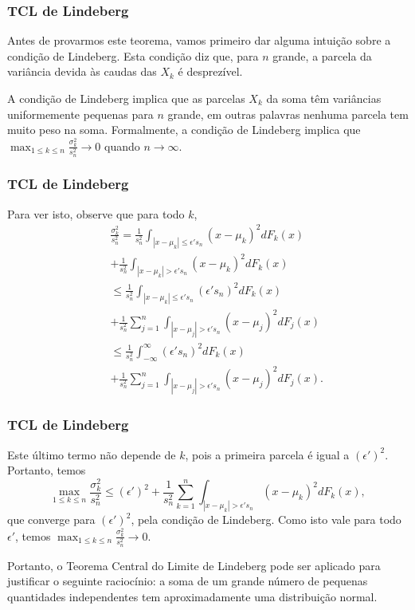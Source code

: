 \begin{frame}
\frametitle{\textbf{TCL de Lindeberg}}
\baselineskip=13pt
\begin{block}{}


Antes de provarmos este teorema, vamos primeiro dar alguma intuição
sobre a condição de Lindeberg. Esta condição diz que, para $n$
grande, a parcela da variância devida às caudas das $X_k$ é
desprezível.

A condição de Lindeberg implica que as parcelas $X_k$ da soma têm
variâncias uniformemente pequenas para $n$ grande, em outras
palavras nenhuma parcela tem muito peso na soma. Formalmente, a
condição de Lindeberg implica que $\max_{1\leq k\leq
n}\frac{\sigma_k^2}{s_n^2}\rightarrow 0$ quando
$n\rightarrow\infty$.
\end{block}
\end{frame}

\begin{frame}
\frametitle{\textbf{TCL de Lindeberg}}
\baselineskip=13pt
\begin{block}{}

Para ver isto, observe que para todo $k$,
\begin{eqnarray}
& & \frac{\sigma_k^2}{s_n^2}=\frac{1}{s_n^2}\int_{|x-\mu_k|\leq
\epsilon' s_n}(x-\mu_k)^2dF_k(x)\nonumber\\
& & +\frac{1}{s_n^2}\int_{|x-\mu_k|>
\epsilon' s_n}(x-\mu_k)^2dF_k(x) \nonumber \\
& & \leq \frac{1}{s_n^2}\int_{|x-\mu_k|\leq \epsilon' s_n}(\epsilon'
s_n)^2dF_k(x)\nonumber\\
&  & +\frac{1}{s_n^2}\sum_{j=1}^{n}\int_{|x-\mu_j|>
\epsilon'
s_n}(x-\mu_j)^2dF_j(x) \nonumber \\
& & \leq \frac{1}{s_n^2}\int_{-\infty}^{\infty}(\epsilon'
s_n)^2dF_k(x)\nonumber\\
& & +\frac{1}{s_n^2}\sum_{j=1}^{n}\int_{|x-\mu_j|>
\epsilon' s_n}(x-\mu_j)^2dF_j(x).\nonumber
\end{eqnarray}

\end{block}
\end{frame}

\begin{frame}
\frametitle{\textbf{TCL de Lindeberg}}
\baselineskip=13pt
\begin{block}{}


Este último termo não depende de $k$, pois a primeira parcela é
igual a $(\epsilon')^2$. Portanto, temos
$$\max_{1\leq k\leq n}\frac{\sigma_k^2}{s_n^2}\leq (\epsilon')^2 +\frac{1}{s_n^2}\sum_{k=1}^{n}\int_{|x-\mu_k|>\epsilon' s_n}(x-\mu_k)^2dF_k(x),$$
que converge para $(\epsilon')^2$, pela condição de Lindeberg. Como
isto vale para todo $\epsilon'$, temos $\max_{1\leq k\leq
n}\frac{\sigma_k^2}{s_n^2}\rightarrow 0$.

Portanto, o Teorema Central do Limite de Lindeberg pode ser aplicado
para justificar o seguinte raciocínio: a soma de um grande número de
pequenas quantidades independentes tem aproximadamente uma
distribuição normal.

\end{block}
\end{frame}

